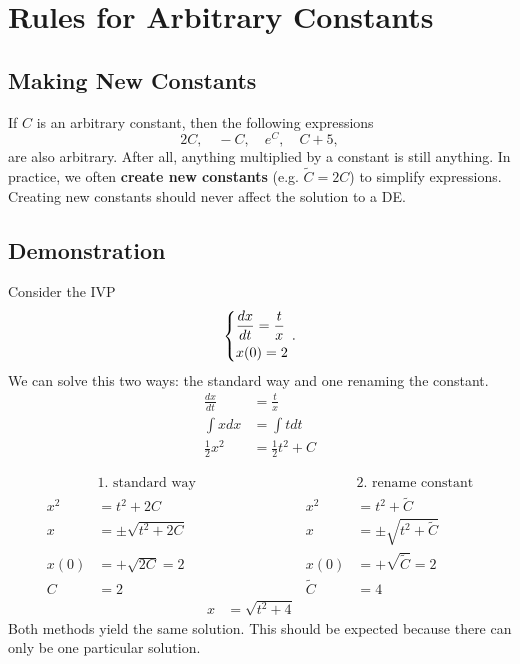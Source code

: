 \documentclass[10pt,letterpaper]{article}
\begin{document}
\section{Rules for Arbitrary Constants}

\subsection{Making New Constants}
If $C$ is an arbitrary constant, then the following expressions
\[
2C, \quad -C, \quad e^C, \quad C+5, 
\]
are also arbitrary. After all, anything multiplied by a constant is still anything. In practice, we often \textbf{create new constants} (e.g. $\tilde{C}=2C$) to simplify expressions. Creating new constants should never affect the solution to a DE.

\subsection{Demonstration}
Consider the IVP
$$
\begin{dcases}
    \frac{dx}{dt}=\frac{t}{x}\\
    x(0)= 2
\end{dcases}.
$$
We can solve this two ways: the standard way and one renaming the constant.
\begin{align*}
    && \frac{dx}{dt}&=\frac{t}{x}  && \\
    &&\int xdx&=\int tdt &&\\
    &&\frac{1}{2}x^2&=\frac{1}{2}t^2+C &&
\end{align*}

\begin{align*}
    &\text{1. standard way} && &  &\text{2. rename constant} \\
    x^2&=t^2+2C && &  x^2&=t^2+\tilde{C} \\
    x&=\pm\sqrt{t^2+2C} && &  x&=\pm\sqrt{t^2+\tilde{C}} \\
    x(0)&=+\sqrt{2C}=2 && &  x(0)&=+\sqrt{\tilde{C}}=2 \\
    C&=2 && &  \tilde{C}&=4 \\
    && x&=\sqrt{t^2+4}  && 
\end{align*}
Both methods yield the same solution. This should be expected because there can only be one particular solution. 
\end{document}
